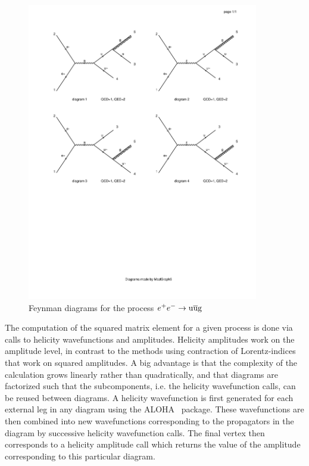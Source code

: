 \begin{figure}
  \centering
  \includegraphics[width=0.9\textwidth, clip=true, trim=1cm 10.5cm 1cm 2cm]
{figures/eventreco_generation/matrix1}
  \caption{Feynman diagrams for the process $e^+ e^- \rightarrow \mathrm{u} \overline{\mathrm{u}} \mathrm{g}$
  \label{fig:madgraph_diagrams}}
\end{figure}

The computation of the squared matrix element for a given process is done via calls to helicity
wavefunctions and amplitudes. Helicity amplitudes work on the amplitude level, in contrast to the
methods using contraction of Lorentz-indices that work on squared amplitudes.  A big advantage is
that the complexity of the calculation grows linearly rather than quadratically, and that diagrams
are factorized such that the subcomponents, i.e. the helicity wavefunction calls, can be reused
between diagrams. 
A helicity wavefunction is first generated for each external leg in any diagram using the
\textsc{ALOHA}~\cite{deAquino:2011ub} package. 
These wavefunctions are then combined into new wavefunctions corresponding to the propagators in the
diagram by successive helicity wavefunction calls. The final vertex then corresponds to a helicity
amplitude call which returns the value of the amplitude corresponding to this particular diagram.

